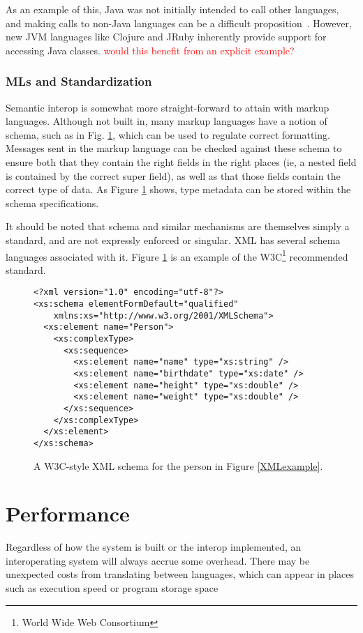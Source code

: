 \documentclass{sig-alternate}
\newcommand{\mycomment}[1]{\textcolor{red}{#1}}
\begin{document}
As an example of this, Java was not initially intended to call other languages, and making calls to non-Java languages can be a difficult proposition~\cite{Chisnall:2013}. However, new JVM languages like Clojure and JRuby inherently provide support for accessing Java classes. \mycomment{would this benefit from an explicit example?}


\subsubsection*{MLs and Standardization}
Semantic interop is somewhat more straight-forward to attain with markup languages. Although not built in, many markup languages have a notion of schema, such as in Fig. \ref{XMLschema}, which can be used to regulate correct formatting. Messages sent in the markup language can be checked against these schema to ensure both that they contain the right fields in the right places (ie, a nested field is contained by the correct super field), as well as that those fields contain the correct type of data. As Figure \ref{XMLschema} shows, type metadata can be stored within the schema specifications.

It should be noted that schema and similar mechanisms are themselves simply a standard, and are not expressly enforced or singular. XML has several schema languages associated with it. Figure \ref{XMLschema} is an example of the W3C\footnote{World Wide Web Consortium} recommended standard.


\begin{figure}
\begin{verbatim}
<?xml version="1.0" encoding="utf-8"?>
<xs:schema elementFormDefault="qualified"
    xmlns:xs="http://www.w3.org/2001/XMLSchema">
  <xs:element name="Person">
    <xs:complexType>
      <xs:sequence>
        <xs:element name="name" type="xs:string" />
        <xs:element name="birthdate" type="xs:date" />
        <xs:element name="height" type="xs:double" />
        <xs:element name="weight" type="xs:double" />
      </xs:sequence>
    </xs:complexType>
  </xs:element>
</xs:schema>
\end{verbatim}
\caption{A W3C-style XML schema for the person in Figure \ref{XMLexample}.}
\label{XMLschema}
\end{figure}



\section{Performance} \label{performance}
Regardless of how the system is built or the interop implemented, an interoperating system will always accrue some overhead. There may be unexpected costs from translating between languages, which can appear in places such as execution speed or program storage space
\end{document}
